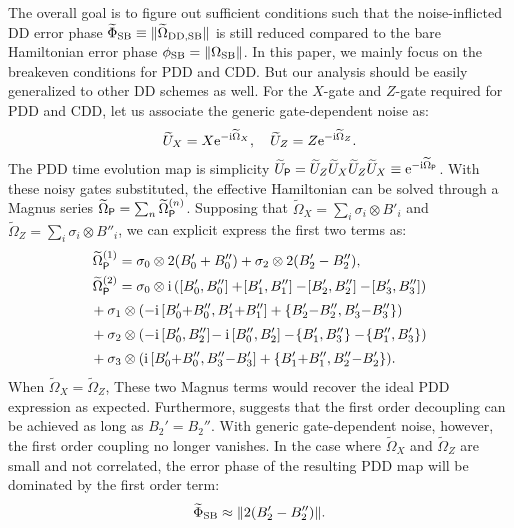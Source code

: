 \documentclass[b5paper,11pt]{article}
\newcommand{\wt}[1]{\widetilde{#1}}
\newcommand{\rDD}{\mathrm{DD}}
\begin{document}
The overall goal is to figure out sufficient conditions such that the noise-inflicted DD error phase $\wt\Phi_\rSB \equiv \norm{\wt\Omega_{\rDD,\rSB}}$  is still reduced compared to the bare Hamiltonian error phase $\phi_{\mathrm{SB}} = \Vert {\Omega_{\mathrm{SB}}} \Vert$.
 In this paper, we mainly focus on the breakeven conditions for PDD and CDD. But our analysis should be easily generalized to other DD schemes as well.
For the $X$-gate and $Z$-gate required for PDD and CDD, let us 
associate the generic gate-dependent noise as:
\begin{equation}\label{eq:gatedep-noise}
\wt U_X= X \upe^{-\upi \wt\Omega_X},
\quad \wt U_Z= Z \upe^{-\upi \wt\Omega_Z}.
\end{equation}
The PDD time evolution map is simplicity $\wt U_\sP =\wt U_Z \wt U_X \wt U_Z \wt U_X\equiv\upe^{-\upi \wt\Omega_\sP}$.
With these noisy gates substituted, the effective Hamiltonian
 can be solved through a Magnus series 
$\wt{\Omega}_{\sP} =\sum_n \wt{\Omega}_{\sP}\up{n}$. 
Supposing that $ \wt\Omega_X = \sum_i \sigma_i \otimes B'_i$ and 
$ \wt\Omega_Z= \sum_i \sigma_i \otimes B''_i$, we can explicit express the first two terms as:
\begin{align}\label{eq:PDDMagGatedep}
&\widetilde{\Omega}_\sP^{(1)} 
= \sigma_0 \otimes 2(B'_0 + B''_0) + \sigma_2 \otimes 2(B_2'-B_2''), \\
&\widetilde{\Omega}_\sP^{(2)} = \notag
\sigma_0 \otimes \upi\,([B'_0,B''_0]+\![B'_1,B''_1]-\![B'_2,B''_2]-\![B'_3,B''_3]) \\[0.5ex]
&\! + \sigma_1 \otimes 
(-\upi\,[B_0'{+}B_0'',B_1'{+}B_1'']+\{B_2'{-}B_2'', B_3'{-}B_3''\}) \notag \\[0.5ex]
 &\!+ \sigma_2 \otimes 
(-\upi\,[B_0',B_2'']\!-\upi\,[B_0'',B_2'] -\! \{B_1',B_3''\}
 -\!\{B_1'',B_3'\} ) \notag\\[0.5ex]
 &\!+\sigma_3 \otimes 
(\upi\,[B_0'{+}B_0'',B_3''{-}B_3'] + \{B_1'{+}B_1'',B_2''{-}B_2'\}).
\label{eq:PDD-gatedep-Mag2}
\end{align}
When $\wt\Omega_X=\wt\Omega_Z$, These two Magnus terms would recover the ideal PDD expression 
 as expected. Furthermore,   suggests that the first order decoupling can be achieved as long as $B_2'=B_2''$.  With generic gate-dependent noise, 
however, the first order coupling no longer vanishes. In the case where $\wt\Omega_X$ and $\wt\Omega_Z$ are small and not correlated,
the error phase of the resulting PDD map will be dominated by the
first order term:
\begin{equation}
    \wt\Phi_{\rSB}\approx \norm{2(B_2'-B_2'') }.
\end{equation} 
\end{document}
